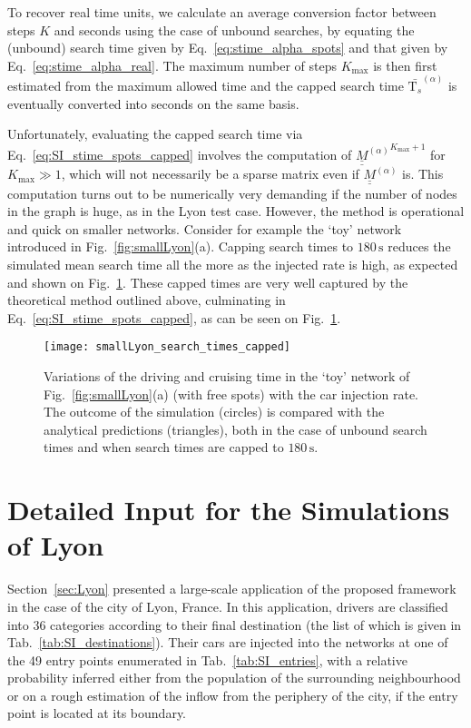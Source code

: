 \documentclass[trsc,reprint]{informs3}
\newcommand{\uul}[1]{\underline{\underline{#1}}}
\newcommand{\alp}{^{(\alpha)}}
\newcommand{\Ma}{ {\uul{M}\alp}}
\newcommand{\Tk}{\mathrm{T}_s}
\begin{document}
\begin{APPENDICES}
To recover real time units, we calculate an average conversion factor between steps $K$ and seconds using the case of unbound searches, by equating the (unbound) search time given by Eq.~\ref{eq:stime_alpha_spots} and that given by Eq.~\ref{eq:stime_alpha_real}. The maximum number of steps $K_{\max}$ is then first estimated from the maximum allowed time and the capped search time $\bar{\Tk}^{(\alpha)}$ is eventually converted into seconds on the same basis.

Unfortunately, evaluating the capped search time via Eq.~\ref{eq:SI_stime_spots_capped} involves the computation of $\Ma^{K_{\max}+1}$ for $K_{\max}\gg 1$, which will not necessarily be a sparse matrix even if $\Ma$ is. This computation turns out to be numerically very demanding if the number
of nodes in the graph is huge, as in the Lyon test case. However, the method is operational and quick on smaller networks. Consider for example the `toy' network introduced in Fig.~\ref{fig:smallLyon}(a). Capping search times to $180\,\mathrm{s}$ reduces the simulated mean search time all the more as the injected rate is high, as expected and shown on Fig.~\ref{fig:SI_search_times_smallLyon}. These capped times are very well captured
by the theoretical method outlined above, culminating in Eq.~\ref{eq:SI_stime_spots_capped}, as can be seen on  Fig.~\ref{fig:SI_search_times_smallLyon}.

\begin{figure}[!htb]
    \centering
        \texttt{[image: smallLyon\_search\_times\_capped]}
\caption{Variations of the driving and cruising time in the `toy' network of Fig.~\ref{fig:smallLyon}(a) (with free spots) with the car injection rate. The outcome of the simulation (circles) is compared with the analytical predictions (triangles), both in the case of unbound search times and when search times are capped to $180\,\mathrm{s}$.}
\label{fig:SI_search_times_smallLyon}
\end{figure}



\section{Detailed Input for the Simulations of Lyon}

Section~\ref{sec:Lyon} presented a large-scale application of the proposed framework in the case of the city of Lyon, France. In this application, drivers are classified into 36 categories according to their
final destination (the list of which is given in Tab.~\ref{tab:SI_destinations}). Their cars are injected into the networks at one of the 49 entry points enumerated in Tab.~\ref{tab:SI_entries}, with a relative probability inferred either from the population of the surrounding neighbourhood or on a rough estimation of the inflow from the periphery of the city, if the entry point is located at its boundary.



\end{APPENDICES}
\end{document}
